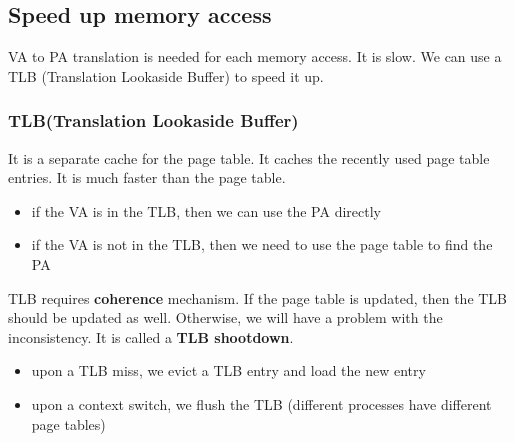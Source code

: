 \documentclass[letterpaper,12pt]{article}
\begin{document}
\subsection{Speed up memory access}
VA to PA translation is needed for each memory access. It is slow. We can use a
TLB (Translation Lookaside Buffer) to speed it up.
\subsubsection{TLB(Translation Lookaside Buffer)}
It is a separate cache for the page table. It caches the recently used page
table entries. It is much faster than the page table.

\begin{itemize}
    \item if the VA is in the TLB, then we can use the PA directly
    \item if the VA is not in the TLB, then we need to use the page table to find the PA
\end{itemize}
TLB requires \textbf{coherence} mechanism. If the page table is updated, then the TLB should be updated as well. Otherwise, we will have a problem with the inconsistency. It is called a \textbf{TLB shootdown}.

\begin{itemize}
    \item upon a TLB miss, we evict a TLB entry and load the new entry
    \item upon a context switch, we flush the TLB (different processes have different
          page tables)
\end{itemize}
\end{document}
